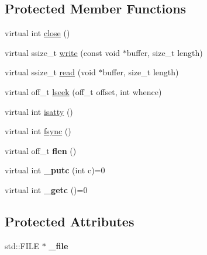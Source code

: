 \subsection*{Protected Member Functions}
\begin{DoxyCompactItemize}
\item 
virtual int \hyperlink{classmbed_1_1_stream_af6289a4ebd6e3e39e713434ee0b5ae1a}{close} ()
\item 
virtual ssize\+\_\+t \hyperlink{classmbed_1_1_stream_a1da24e639462b324eaf9a7fa4ebbe9c5}{write} (const void $\ast$buffer, size\+\_\+t length)
\item 
virtual ssize\+\_\+t \hyperlink{classmbed_1_1_stream_a23d92c19945db06a616481bfdad5b41b}{read} (void $\ast$buffer, size\+\_\+t length)
\item 
virtual off\+\_\+t \hyperlink{classmbed_1_1_stream_ab5d71558dfc46985f9b3ca66099f845e}{lseek} (off\+\_\+t offset, int whence)
\item 
virtual int \hyperlink{classmbed_1_1_stream_a1ad0b3f218c68d8f7aeb24f4878b6347}{isatty} ()
\item 
virtual int \hyperlink{classmbed_1_1_stream_a9964211822494845a9ef8fe514aa5bbd}{fsync} ()
\item 
virtual off\+\_\+t {\bfseries flen} ()\hypertarget{classmbed_1_1_stream_a33cb53db6b3d6182d2acdd6d3c1a072b}{}\label{classmbed_1_1_stream_a33cb53db6b3d6182d2acdd6d3c1a072b}

\item 
virtual int {\bfseries \+\_\+putc} (int c)=0\hypertarget{classmbed_1_1_stream_a28fbd18ed2335b37b896ce73f3cf9941}{}\label{classmbed_1_1_stream_a28fbd18ed2335b37b896ce73f3cf9941}

\item 
virtual int {\bfseries \+\_\+getc} ()=0\hypertarget{classmbed_1_1_stream_a262e3791dc36a057eb1a6a7461bacc8f}{}\label{classmbed_1_1_stream_a262e3791dc36a057eb1a6a7461bacc8f}

\end{DoxyCompactItemize}
\subsection*{Protected Attributes}
\begin{DoxyCompactItemize}
\item 
std\+::\+F\+I\+LE $\ast$ {\bfseries \+\_\+file}\hypertarget{classmbed_1_1_stream_ae4ee478b704c5cc1e55fed9b17398875}{}\label{classmbed_1_1_stream_ae4ee478b704c5cc1e55fed9b17398875}

\end{DoxyCompactItemize}
